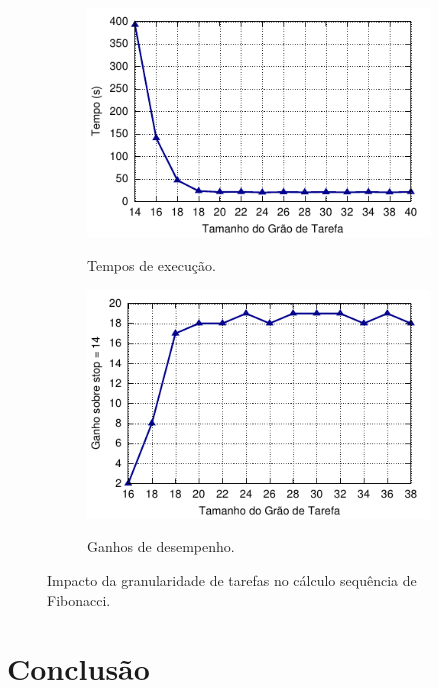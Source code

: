 \documentclass{SBCbookchapter}
\begin{document}
	
		\begin{figure}[t]
			\captionsetup[subfigure]{justification=centering}
			\centering
				\begin{subfigure}{0.45\linewidth}
					\includegraphics[width=\linewidth]{img/fibonacci-task-grain}
					\label{fig:grao-tarefas-tempo}
					\caption{Tempos de execução.}
				\end{subfigure}
				\quad
				\begin{subfigure}{0.45\linewidth}
					\includegraphics[width=\linewidth]{img/fibonacci-speedup}
					\label{fig:grao-tarefas-ganho}
					\caption{Ganhos de desempenho.}
				\end{subfigure}
			\caption{Impacto da granularidade de tarefas no cálculo sequência
				de Fibonacci.}
			\label{fig:grao-tarefas}
		\end{figure}

\section{Conclusão}
\label{sec:conclusao}
\end{document}
